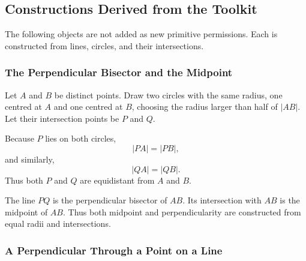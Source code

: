 \subsection{Constructions Derived from the Toolkit}

The following objects are not added as new primitive permissions. Each is
constructed from lines, circles, and their intersections.

\subsubsection{The Perpendicular Bisector and the Midpoint}

\begin{derivationbox}[Construction]
Let $A$ and $B$ be distinct points. Draw two circles with the same radius,
one centred at $A$ and one centred at $B$, choosing the radius larger than half
of $|AB|$. Let their intersection points be $P$ and $Q$.

Because $P$ lies on both circles,
\[
|PA|=|PB|,
\]
and similarly,
\[
|QA|=|QB|.
\]
Thus both $P$ and $Q$ are equidistant from $A$ and $B$.
\end{derivationbox}

\begin{center}
\end{center}

\begin{theorembox}
The line $PQ$ is the perpendicular bisector of $AB$. Its intersection with
$AB$ is the midpoint of $AB$. Thus both midpoint and perpendicularity are
constructed from equal radii and intersections.
\end{theorembox}

\subsubsection{A Perpendicular Through a Point on a Line}


